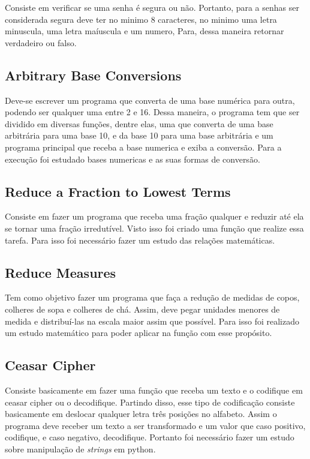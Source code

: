 Consiste em verificar se uma senha é segura ou não. Portanto, para a senhas ser considerada segura deve ter no minimo 8 caracteres, no minimo uma letra minuscula, uma letra maíuscula e um numero, Para, dessa maneira retornar verdadeiro ou falso.

\subsection{Arbitrary Base Conversions}

Deve-se escrever um programa que converta de uma base numérica para outra, podendo ser qualquer uma entre 2 e 16. Dessa maneira, o programa tem que ser dividido em diversas funções, dentre elas, uma que converta de uma base arbitrária para uma base 10, e da base 10 para uma base arbitrária e um programa principal que receba a base numerica e exiba a conversão. Para a execução foi estudado bases numericas e as suas formas de conversão. 

\subsection{Reduce a Fraction to Lowest Terms}

Consiste em fazer um programa que receba uma fração qualquer e reduzir até ela se tornar uma fração irredutível. Visto isso foi criado uma função que realize essa tarefa. Para isso foi necessário fazer um estudo das relações matemáticas.

\subsection{Reduce Measures}

Tem como objetivo fazer um programa que faça a redução de medidas de copos, colheres de sopa e colheres de chá. Assim, deve pegar unidades menores de medida e distribuí-las na escala maior assim que possível. Para isso foi realizado um estudo matemático para poder aplicar na função com esse propósito. 

\subsection{Ceasar Cipher}

Consiste basicamente em fazer uma função que receba um texto e o codifique em ceasar cipher ou o decodifique. Partindo disso, esse tipo de codificação consiste basicamente em deslocar qualquer letra três posições no alfabeto. Assim o programa deve receber um texto a ser transformado e um valor que caso positivo, codifique, e caso negativo, decodifique. Portanto foi necessário fazer um estudo sobre manipulação de \textit{strings} em python.

